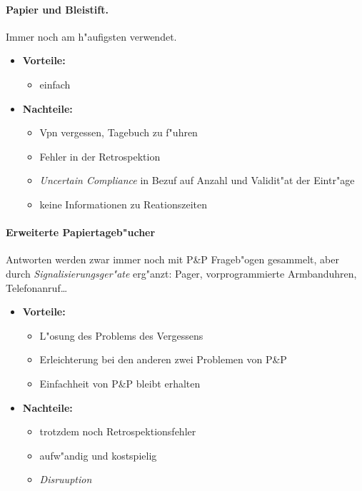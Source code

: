 \paragraph{Papier und Bleistift.}
Immer noch am h"aufigsten verwendet.
\begin{itemize}
        \item \textbf{Vorteile:}
                \begin{itemize}
                        \item einfach
                \end{itemize}
        \item \textbf{Nachteile:}
                \begin{itemize}
                        \item Vpn vergessen, Tagebuch zu f"uhren
                        \item Fehler in der Retrospektion
                        \item \emph{Uncertain Compliance} in Bezuf auf Anzahl und Validit"at der Eintr"age
                        \item keine Informationen zu Reationszeiten
                \end{itemize}
\end{itemize}

\paragraph{Erweiterte Papiertageb"ucher}
Antworten werden zwar immer noch mit P\&P Frageb"ogen gesammelt, aber durch \emph{Signalisierungsger"ate} erg"anzt: Pager, vorprogrammierte Armbanduhren, Telefonanruf\ldots
\begin{itemize}
        \item \textbf{Vorteile:}
                \begin{itemize}
                        \item L"osung des Problems des Vergessens
                        \item Erleichterung bei den anderen zwei Problemen von P\&P
                        \item Einfachheit von P\&P bleibt erhalten
                \end{itemize}
        \item \textbf{Nachteile:}
                \begin{itemize}
                        \item trotzdem noch Retrospektionsfehler
                        \item aufw"andig und kostspielig
                        \item \emph{Disruuption}
                \end{itemize}
\end{itemize}

